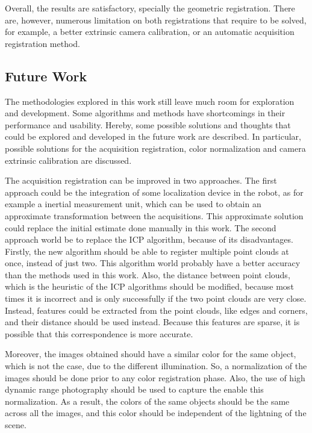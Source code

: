 Overall, the results are satisfactory, specially the geometric registration. There are, however, numerous limitation on both registrations that require to be solved, for example, a better extrinsic camera calibration, or an automatic acquisition registration method.


\subsection{Future Work}
\label{section:future-work}

The methodologies explored in this work still leave much room for exploration and development. Some algorithms and methods have shortcomings in their performance and usability. Hereby, some possible solutions and thoughts that could be explored and developed in the future work are described. In particular, possible solutions for the acquisition registration, color normalization and camera extrinsic calibration are discussed.

The acquisition registration can be improved in two approaches. The first approach could be the integration of some localization device in the robot, as for example a inertial measurement unit, which can be used to obtain an approximate transformation between the acquisitions. This approximate solution could replace the initial estimate done manually in this work. The second approach world be  to replace the ICP algorithm, because of its disadvantages. Firstly, the new algorithm should be able to register multiple point clouds at once, instead of just two. This algorithm world probably have a better accuracy than the methods used in this work. Also, the distance between point clouds, which is the heuristic of the ICP algorithms should be modified, because most times it is incorrect and is only successfully if the two point clouds are very close. Instead, features could be extracted from the point clouds, like edges and corners, and their distance should be used instead. Because this features are sparse, it is possible that this correspondence is more accurate.

Moreover, the images obtained should have a similar color for the same object, which is not the case, due to the different illumination. So, a normalization of the images should be done prior to any color registration phase. Also, the use of high dynamic range photography should be used to capture the enable this normalization. As a result, the colors of the same objects should be the same across all the images, and this color should be independent of the lightning of the scene.

